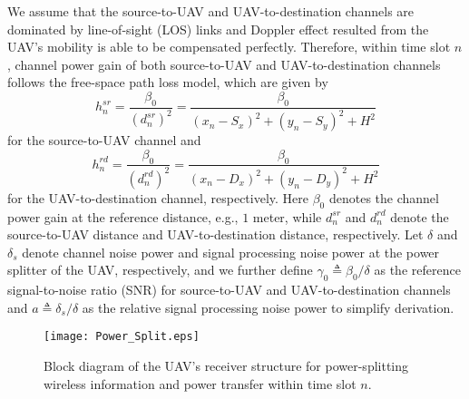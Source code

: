 \documentclass[12pt, draftclsnofoot, onecolumn]{IEEEtran}
\begin{document}
We assume that the source-to-UAV and UAV-to-destination channels are dominated by line-of-sight (LOS) links and Doppler effect resulted from the UAV's mobility is able to be compensated perfectly\cite{7572068}. Therefore, within time slot $n$, channel power gain of both source-to-UAV and UAV-to-destination channels follows the free-space path loss model, which are given by
\begin{equation}
h^{sr}_{n}=\dfrac{\beta_{0}}{(d^{sr}_{n})^{2}}=\dfrac{\beta_{0}}{(x_{n}-S_{x})^{2}+(y_{n}-S_{y})^{2}+H^{2}}
\end{equation}
for the source-to-UAV channel and 
\begin{equation}
h^{rd}_{n}=\dfrac{\beta_{0}}{(d^{rd}_{n})^{2}}=\dfrac{\beta_{0}}{(x_{n}-D_{x})^{2}+(y_{n}-D_{y})^{2}+H^{2}}
\end{equation}
for the UAV-to-destination channel, respectively. Here $\beta_{0}$ denotes the channel power gain at the reference distance, e.g., $1$ meter, while $d^{sr}_{n}$ and $d^{rd}_{n}$ denote the source-to-UAV distance and UAV-to-destination distance, respectively. Let $\delta$ and $\delta_{s}$ denote channel noise power and signal processing noise power at the power splitter of the UAV, respectively, and we further define $\gamma_{0}\triangleq\beta_{0}/\delta$ as the reference signal-to-noise ratio (SNR) for source-to-UAV and UAV-to-destination channels and $a\triangleq\delta_{s}/\delta$ as the relative signal processing noise power to simplify derivation. 

\begin{figure}
\centering
 \texttt{[image: Power\_Split.eps]}
\caption{Block diagram of the UAV's receiver structure for power-splitting wireless information and power transfer within time slot $n$.}
\label{fig:Power_Split}
\vspace*{-0.15in}
\end{figure}
\end{document}
